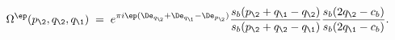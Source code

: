 \begin{equation}
\Omega^{\ep}(p_\2,q_\2,q_\1)\;=\;e^{\pi i\ep(\De_{q_\2}+\De_{q_\1}-\De_{p_\2})}
\frac{s_b(p_\2+q_\1-q_\2)}{s_b(p_\2+q_\2-q_\1)}
\frac{s_b(2q_\2-c_b)}{s_b(2q_\1-c_b)}.
\end{equation}

